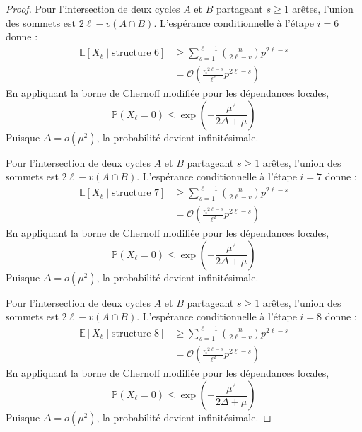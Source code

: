 \documentclass[11pt,a4paper]{article}
\theoremstyle{definition}
\begin{document}
\begin{proof}
Pour l'intersection de deux cycles $A$ et $B$ partageant $s \ge 1$ arêtes, l'union des sommets est $2\ell - v(A \cap B)$.
L'espérance conditionnelle à l'étape $i=6$ donne :
\begin{align*}
\mathbb{E}[X_\ell \mid \text{structure } 6] &\ge \sum_{s=1}^{\ell-1} \binom{n}{2\ell - v} p^{2\ell - s} \\
&= \mathcal{O}\left( \frac{n^{2\ell - s}}{\ell^2} p^{2\ell - s} \right)
\end{align*}
En appliquant la borne de Chernoff modifiée pour les dépendances locales,
\begin{equation}
\mathbb{P}(X_\ell = 0) \le \exp\left(-\frac{\mu^2}{2\Delta + \mu}\right)
\end{equation}
Puisque $\Delta = o(\mu^2)$, la probabilité devient infinitésimale.

Pour l'intersection de deux cycles $A$ et $B$ partageant $s \ge 1$ arêtes, l'union des sommets est $2\ell - v(A \cap B)$.
L'espérance conditionnelle à l'étape $i=7$ donne :
\begin{align*}
\mathbb{E}[X_\ell \mid \text{structure } 7] &\ge \sum_{s=1}^{\ell-1} \binom{n}{2\ell - v} p^{2\ell - s} \\
&= \mathcal{O}\left( \frac{n^{2\ell - s}}{\ell^2} p^{2\ell - s} \right)
\end{align*}
En appliquant la borne de Chernoff modifiée pour les dépendances locales,
\begin{equation}
\mathbb{P}(X_\ell = 0) \le \exp\left(-\frac{\mu^2}{2\Delta + \mu}\right)
\end{equation}
Puisque $\Delta = o(\mu^2)$, la probabilité devient infinitésimale.

Pour l'intersection de deux cycles $A$ et $B$ partageant $s \ge 1$ arêtes, l'union des sommets est $2\ell - v(A \cap B)$.
L'espérance conditionnelle à l'étape $i=8$ donne :
\begin{align*}
\mathbb{E}[X_\ell \mid \text{structure } 8] &\ge \sum_{s=1}^{\ell-1} \binom{n}{2\ell - v} p^{2\ell - s} \\
&= \mathcal{O}\left( \frac{n^{2\ell - s}}{\ell^2} p^{2\ell - s} \right)
\end{align*}
En appliquant la borne de Chernoff modifiée pour les dépendances locales,
\begin{equation}
\mathbb{P}(X_\ell = 0) \le \exp\left(-\frac{\mu^2}{2\Delta + \mu}\right)
\end{equation}
Puisque $\Delta = o(\mu^2)$, la probabilité devient infinitésimale.


\end{proof}
\end{document}
